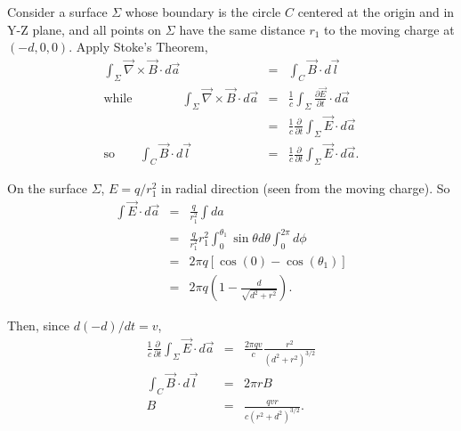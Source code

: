 \documentclass[makesolutionspdf]{esg8022pset}
\begin{document}
\begin{solution}
Consider a surface $\Sigma$ whose boundary is the circle $C$ centered
at the origin and in Y-Z plane, and all points on $\Sigma$ have the
same distance $r_1$ to the moving charge at $(-d,0,0)$.  Apply Stoke's
Theorem,
\begin{eqnarray}
\int_{\Sigma} \vec{\nabla}\times\vec{B}\cdot d\vec{a} &=& \int_C
\vec{B}\cdot d\vec{l}\\
\textrm{while} \qquad\qquad \int_{\Sigma} \vec{\nabla}\times\vec{B}\cdot
d\vec{a} &=& \frac{1}{c}\int_{\Sigma} \frac{\partial \vec{E}}{\partial
t}\cdot d\vec{a}\nonumber\\
&=& \frac{1}{c}\frac{\partial}{\partial t}\int_{\Sigma} \vec{E}\cdot
d\vec{a}\\
\textrm{so}\qquad \int_C \vec{B}\cdot d\vec{l} &=& 
\frac{1}{c}\frac{\partial}{\partial t}\int_{\Sigma} \vec{E}\cdot
d\vec{a}.
\end{eqnarray}

On the surface $\Sigma$, $E=q/r_1^2$ in radial direction (seen from
the moving charge).  So
\begin{eqnarray}
\int \vec{E}\cdot d\vec{a} &=& \frac{q}{r_1^2}\int da\nonumber\\
&=& \frac{q}{r_1^2}r_1^2\int_{0}^{\theta_1}\sin\theta d\theta
\int_0^{2\pi}d\phi\nonumber\\
&=& 2\pi q\left[\cos(0) - \cos(\theta_1)\right]\nonumber\\
&=& 2\pi q(1-\frac{d}{\sqrt{d^2+r^2}}).
\end{eqnarray}

Then, since $d(-d)/dt=v$,
\begin{eqnarray}
\frac{1}{c}\frac{\partial}{\partial t}\int_{\Sigma} \vec{E}\cdot
d\vec{a} &=& \frac{2\pi qv}{c}\frac{r^2}{(d^2+r^2)^{3/2}}\\
\int_C \vec{B}\cdot d\vec{l} &=& 2\pi rB\\
B&=& \frac{qvr}{c(r^2+d^2)^{3/2}}.
\end{eqnarray}


\end{solution}
\end{document}
